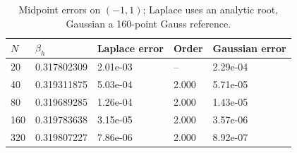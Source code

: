 \begin{table}[htbp]
\centering
\caption{Midpoint errors on $(-1,1)$; Laplace uses an analytic root, Gaussian a 160-point Gauss reference.}
\label{tab:convergence}
\begin{tabular}{lllll}
\toprule
$N$ & $\beta_h$ & Laplace error & Order & Gaussian error \\
\midrule
20 & 0.317802309 & 2.01e-03 & -- & 2.29e-04 \\
40 & 0.319311875 & 5.03e-04 & 2.000 & 5.71e-05 \\
80 & 0.319689285 & 1.26e-04 & 2.000 & 1.43e-05 \\
160 & 0.319783638 & 3.15e-05 & 2.000 & 3.57e-06 \\
320 & 0.319807227 & 7.86e-06 & 2.000 & 8.92e-07 \\
\bottomrule
\end{tabular}
\end{table}
